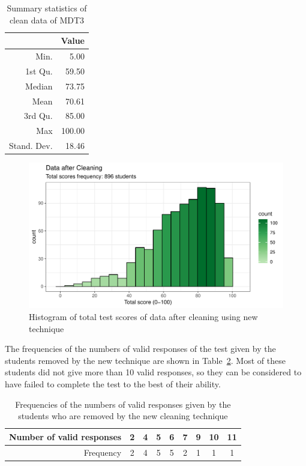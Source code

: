\documentclass[a4paper]{report}
\begin{document}
\begin{table}[ht]
  \centering
  \begin{tabular}{rr}
    \hline
    & Value \\ 
     \hline
   Min. & 5.00 \\ 
     1st Qu. & 59.50 \\ 
     Median & 73.75 \\ 
     Mean & 70.61 \\ 
     3rd Qu. & 85.00 \\ 
     Max & 100.00 \\ 
     Stand. Dev. & 18.46 \\ 
      \hline
  \end{tabular}
  \caption{\label{tab:EDA_dsc_17clean}Summary statistics of clean data of MDT3}
\end{table}

\begin{figure}[H]
  \centering
  \includegraphics[width=\linewidth]{fig/EDA_hist_17clean.pdf}
  \caption{\label{fig:EDA_hist_17clean}Histogram of total test scores of data after cleaning using new technique}
\end{figure}

The frequencies of the numbers of valid responses of the test given by the students removed by the new technique are shown in Table~\ref{tab:EDA_validresp}. Most of these students did not give more than 10 valid responses, so they can be considered to have failed to complete the test to the best of their ability. 

\begin{table}[ht]
  \centering
  \begin{tabular}{rcccccccc}
    \hline
  Number of valid responses & 2 & 4 & 5 & 6 & 7 & 9 & 10 & 11 \\ 
    \hline
    Frequency & 2 & 4 & 5 & 5 & 2 & 1 & 1 & 1 \\ 
     \hline
  \end{tabular}
  \caption{\label{tab:EDA_validresp}Frequencies of the numbers of valid responses given by the students who are removed by the new cleaning technique}
\end{table}
\end{document}

